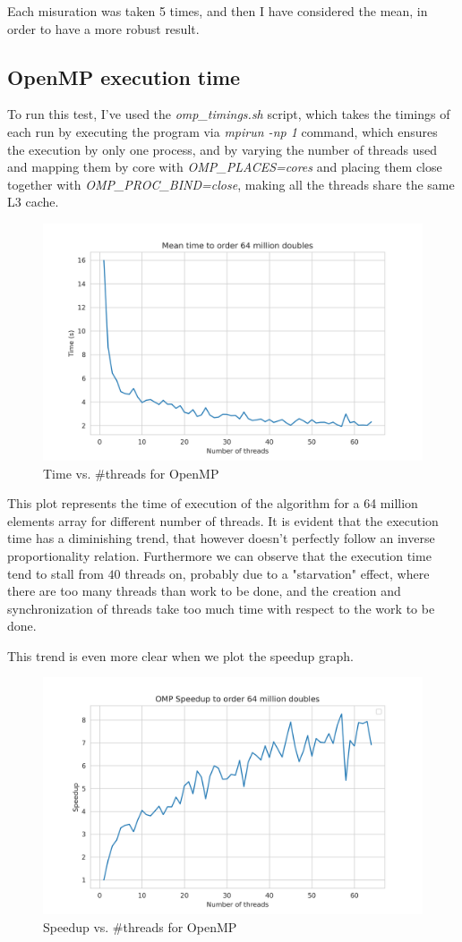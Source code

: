 \documentclass{article}
\begin{document}
	Each misuration was taken 5 times, and then I have considered the mean, in order to have a more robust result.
	
	\subsection{OpenMP execution time}
	
	To run this test, I've used the \textit{omp\_timings.sh} script, which takes the timings of each run by executing the program via \textit{mpirun -np 1} command, which ensures the execution by only one process, and by varying the number of threads used and mapping them by core with \textit{OMP\_PLACES=cores} and placing them close together with \textit{OMP\_PROC\_BIND=close}, making all the threads share the same L3 cache. 
	
	\begin{figure}[h]
		\centering
		\includegraphics[width=0.5\linewidth]{../exercise2/plots/omp_timings}
		\caption[OMP timings]{Time vs. \#threads for OpenMP}
		\label{fig:omptimings}
	\end{figure}
	
	This plot represents the time of execution of the algorithm for a 64 million elements array for different number of threads.
	It is evident that the execution time has a diminishing trend, that however doesn't perfectly follow an inverse proportionality relation. Furthermore we can observe that the execution time tend to stall from $40$ threads on, probably due to a "starvation" effect, where there are too many threads than work to be done, and the creation and synchronization of threads take too much time with respect to the work to be done. 
	
	
	This trend is even more clear when we plot the speedup graph.
	
	\begin{figure}[h]
		\centering
		\includegraphics[width=0.7\linewidth]{../exercise2/plots/omp_speedup}
		\caption[OMP Speedup]{Speedup vs. \#threads for OpenMP}
		\label{fig:ompspeedup}
	\end{figure}
	
\end{document}
